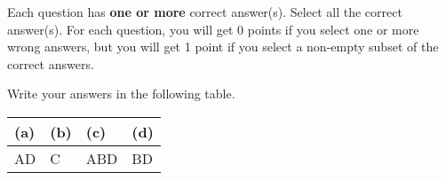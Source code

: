 
Each question has \textbf{one or more} correct answer(s). Select all the correct answer(s). For each question, you will get 0 points if you select one or more wrong answers, but you will get 1 point if you select a non-empty subset of the correct answers.

Write your answers in the following table.


\begin{table}[htbp]
    \centering
    \begin{tabular}{|p{2cm}|p{2cm}|p{2cm}|p{2cm}|}
        \hline
        (a) & (b) & (c) & (d) \\
        \hline
        AD  & C   & ABD & BD  \\
        \hline
    \end{tabular}
\end{table}

